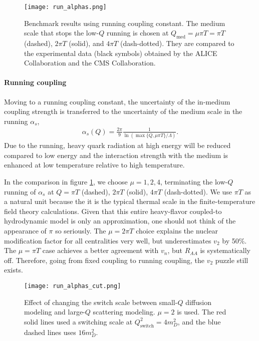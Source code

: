 \begin{figure}
\centering
\texttt{[image: run\_alphas.png]}
\caption{Benchmark results using running coupling constant. The medium scale that stops the low-$Q$ running is chosen at $Q_{\textrm{med}} = \mu\pi T = \pi T$ (dashed), $2\pi T$ (solid), and $4\pi T$ (dash-dotted). They are compared to the experimental data (black symbols) obtained by the ALICE Collaboration and the CMS Collaboration.}
\label{fig:new:run-a}
\end{figure}

\paragraph{Running coupling} Moving to a running coupling constant, the uncertainty of the in-medium coupling strength is transferred to the uncertainty of the medium scale in the running $\alpha_s$,
\begin{eqnarray}
\alpha_s(Q) = \frac{2\pi}{9}\frac{1}{\ln \left( \max\{Q, \mu\pi T\} / \Lambda\right)}.
\end{eqnarray}
Due to the running, heavy quark radiation at high energy will be reduced compared to low energy and the interaction strength with the medium is enhanced at low temperature relative to high temperature.

In the comparison in figure \ref{fig:new:run-a}, we choose $\mu = 1, 2, 4$, terminating the low-$Q$ running of $\alpha_s$ at $Q = \pi T$ (dashed), $2\pi T$ (solid), $4\pi T$ (dash-dotted).
We use $\pi T$ as a natural unit because the it is the typical thermal scale in the finite-temperature field theory calculations.
Given that this entire heavy-flavor coupled-to hydrodynamic model is only an approximation, one should not think of the appearance of $\pi$ so seriously.
The $\mu=2\pi T$ choice explains the nuclear modification factor for all centralities very well, but underestimates $v_2$ by 50\%.
The $\mu=\pi T$ case achieves a better agreement with $v_n$, but $R_{AA}$ is systematically off.
Therefore, going from fixed coupling to running coupling, the $v_2$ puzzle still exists.

\begin{figure}
\centering
\texttt{[image: run\_alphas\_cut.png]}
\caption{Effect of changing the switch scale between small-$Q$ diffusion modeling and large-$Q$ scattering modeling. $\mu=2$ is used. The red solid lines used a switching scale at $Q_{\textrm{switch}}^2 = 4 m_D^2$, and the blue dashed lines uses $16 m_D^2$.}
\label{fig:new:run-cut}
\end{figure}

